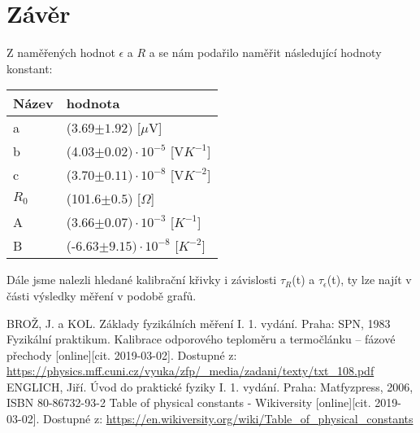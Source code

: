\documentclass{article}
\begin{document}
\section*{Závěr}
\par Z naměřených hodnot $\epsilon$ a $R$ a se nám podařilo naměřit následující hodnoty konstant:
\begin{center}
    \begin{tabular}{ | l | p{5cm} |}
    \hline
    Název & hodnota \\ \hline
    a & (3.69$\pm1.92)$ [$\mu$V]  \\ \hline
    b & (4.03$\pm0.02)\cdot10^{-5}$ [V$K^{-1}$] \\ \hline
    c & (3.70$\pm0.11)\cdot10^{-8}$ [V$K^{-2}$]  \\ \hline
    $R_{0}$ & (101.6$\pm0.5)$ [$\Omega$]  \\ \hline
    A & (3.66$\pm0.07)\cdot10^{-3}$ [$K^{-1}$] \\ \hline
    B & (-6.63$\pm9.15)\cdot10^{-8}$ [$K^{-2}$]\\ \hline
    \end{tabular}
\end{center}
\par Dále jsme nalezli hledané kalibrační křivky i závislosti $\tau_{R}$(t) a $\tau_{\epsilon}$(t), ty lze najít v části výsledky měření v podobě grafů.

\renewcommand\refname{Použitá literatura}
\begin{thebibliography}{}
BROŽ, J. a KOL. Základy fyzikálních měření I. 1. vydání. Praha: SPN, 1983
Fyzikální praktikum. Kalibrace odporového teploměru a termočlánku – fázové přechody [online][cit. 2019-03-02]. Dostupné z:  
\url{https://physics.mff.cuni.cz/vyuka/zfp/_media/zadani/texty/txt_108.pdf}
ENGLICH, Jiří. Úvod do praktické fyziky I. 1. vydání. Praha: Matfyzpress, 2006, ISBN 80-86732-93-2
Table of physical constants - Wikiversity [online][cit. 2019-03-02]. Dostupné z:  
\url{https://en.wikiversity.org/wiki/Table_of_physical_constants}
\end{thebibliography}
\end{document}

